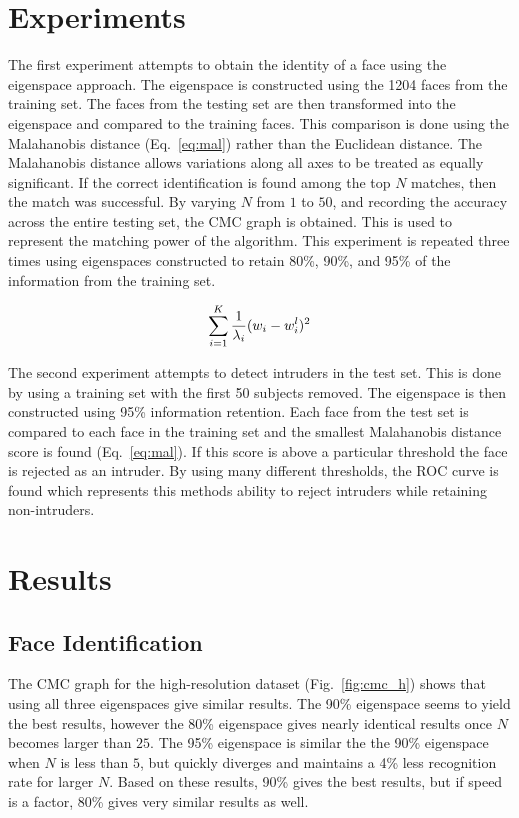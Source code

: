 \section{Experiments}

  The first experiment attempts to obtain the identity of a face using the eigenspace
  approach.  The eigenspace is constructed using the 1204 faces from the training set.
  The faces from the testing set are then transformed into the eigenspace and compared
  to the training faces.  This comparison is done using the Malahanobis distance 
  (Eq.~\ref{eq:mal}) rather than the Euclidean distance.  The Malahanobis distance
  allows variations along all axes to be treated as equally significant.  If the correct
  identification is found among the top $N$ matches, then the match was successful.  By
  varying $N$ from $1$ to $50$, and recording the accuracy across the entire testing set,
  the CMC graph is obtained.  This is used to represent the matching power of the
  algorithm.  This experiment is repeated three times using eigenspaces constructed to
  retain 80\%, 90\%, and 95\% of the information from the training set.

  \begin{equation}
    \sum_{i=1}^K {1 \over \lambda_i} (w_i - w_i^l)^2
    \label{eq:mal}
  \end{equation}

  The second experiment attempts to detect intruders in the test set.  This is done by
  using a training set with the first 50 subjects removed.  The eigenspace is then
  constructed using 95\% information retention.  Each face from the test set is compared
  to each face in the training set and the smallest Malahanobis distance score is found
  (Eq.~\ref{eq:mal}).  If this score is above a particular threshold the face is
  rejected as an intruder.  By using many different thresholds, the ROC curve is found
  which represents this methods ability to reject intruders while retaining non-intruders.

\section{Results}

  \subsection{Face Identification}

  The CMC graph for the high-resolution dataset (Fig.~\ref{fig:cmc_h}) shows that using
  all three eigenspaces give similar results.  The 90\% eigenspace seems to yield the best
  results, however the 80\% eigenspace gives nearly identical results once $N$ becomes
  larger than $25$.  The 95\% eigenspace is similar the the 90\% eigenspace when $N$ is
  less than $5$, but quickly diverges and maintains a 4\% less recognition rate for larger
  $N$.  Based on these results, 90\% gives the best results, but if speed is a factor, 80\%
  gives very similar results as well.

